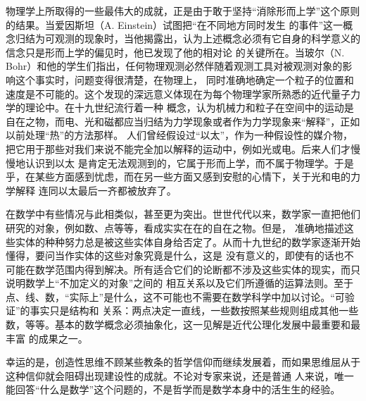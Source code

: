 物理学上所取得的一些最伟大的成就，正是由于敢于坚持“消除形而上学”这个原则的结果。当爱因斯坦（A. Einstein）试图把“在不同地方同时发生
的事件”这一概念归结为可观测的现象时，当他揭露出，认为上述概念必须有它自身的科学意义的信念只是形而上学的偏见时，他已发现了他的相对论
的关键所在。当玻尔（N. Bohr）和他的学生们指出，任何物理观测必然伴随着观测工具对被观测对象的影响这个事实时，问题变得很清楚，在物理上，
同时准确地确定一个粒子的位置和速度是不可能的。这个发现的深远意义体现在为每个物理学家所熟悉的近代量子力学的理论中。在十九世纪流行着一种
概念，认为机械力和粒子在空间中的运动是自在之物，而电、光和磁都应当归结为力学现象或者作为力学现象来“解释”，正如以前处理“热”的方法那样。
人们曾经假设过“以太”，作为一种假设性的媒介物，把它用于那些对我们来说不能完全加以解释的运动中，例如光或电。后来人们才慢慢地认识到以太
是肯定无法观测到的，它属于形而上学，而不属于物理学。于是乎，在某些方面感到忧虑，而在另一些方面又感到安慰的心情下，关于光和电的力学解释
连同以太最后一齐都被放弃了。

在数学中有些情况与此相类似，甚至更为突出。世世代代以来，数学家一直把他们研究的对象，例如数、点等等，看成实实在在的自在之物。但是，
准确地描述这些实体的种种努力总是被这些实体自身给否定了。从而十九世纪的数学家逐渐开始懂得，要问当作实体的这些对象究竟是什么，这是
没有意义的，即使有的话也不可能在数学范围内得到解决。所有适合它们的论断都不涉及这些实体的现实，而只说明数学上“不加定义的对象”之间的
相互关系以及它们所遵循的运算法则。至于点、线、数，“实际上”是什么，这不可能也不需要在数学科学中加以讨论。“可验证”的事实只是结构和
关系：两点决定一直线，一些数按照某些规则组成其他一些数，等等。基本的数学概念必须抽象化，这一见解是近代公理化发展中最重要和最丰富
的成果之一。

幸运的是，创造性思维不顾某些教条的哲学信仰而继续发展着，而如果思维屈从于这种信仰就会阻碍出现建设性的成就。不论对专家来说，还是普通
人来说，唯一能回答“什么是数学”这个问题的，不是哲学而是数学本身中的活生生的经验。